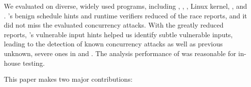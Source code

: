 


We evaluated \xxx on \nreproducedProgs diverse, widely used programs, including 
\apache, \chrome, \libsafe, Linux kernel, \mysql, and \ssdb. \xxx's benign 
schedule hints and runtime verifiers reduced \reducerate of the race 
reports, and it did not miss the evaluated concurrency attacks. With the 
greatly reduced reports, \xxx's vulnerable input hints helped us identify 
subtle vulnerable inputs, leading to the detection of \nknownVul known 
concurrency attacks as well as \nunknownVul previous unknown, severe ones in 
\ssdb and \apache. The analysis performance of \xxx was reasonable for in-house 
testing.


This paper makes two major contributions: 

